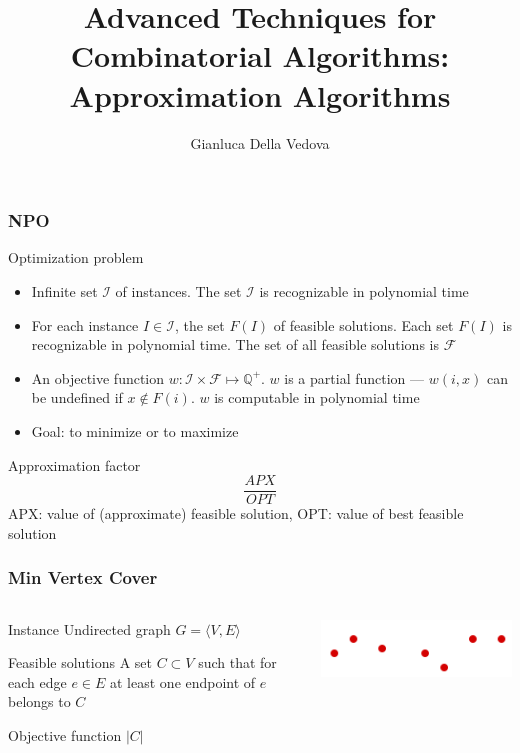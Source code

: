 \documentclass[12pt,aspectratio=169]{beamer}
\author{Gianluca Della Vedova}
\title[Advanced Algorithms]{Advanced Techniques for Combinatorial Algorithms:
Approximation Algorithms}
\institute[]{Univ. Milano--Bicocca\\
  \texttt{https://gianluca.dellavedova.org}}
\begin{document}
\begin{frame}
  \titlepage
\end{frame}



\begin{frame}\frametitle{NPO}
  \begin{block}{Optimization problem}
      \begin{itemize}
  \item
    Infinite set $\mathcal{I}$ of instances.
%
    The set $\mathcal{I}$ is recognizable in polynomial time
  \item
    For each instance $I\in\mathcal{I}$, the set $F(I)$ of feasible solutions.
%
    Each set $F(I)$ is recognizable in polynomial time.
%
    The set of all feasible solutions is $\mathcal{F}$
  \item
    An objective function $w: \mathcal{I} \times \mathcal{F}\mapsto \mathbb{Q}^{+}$.
%
    $w$ is a partial function --- $w(i,x)$ can be undefined if $x\notin F(i)$.
%
    $w$ is computable in polynomial time
  \item
    Goal: to minimize or to maximize
  \end{itemize}
\end{block}
\begin{block}{Approximation factor}
  $$\frac{APX}{OPT}$$
  APX: value of (approximate) feasible solution, OPT: value of best feasible solution
  \end{block}
\end{frame}

\begin{frame}\frametitle{Min Vertex Cover }
\begin{columns} 
  \begin{column}{0.48\textwidth}
  \begin{block}{Instance}
    Undirected graph $G=\langle V,E \rangle$
  \end{block}
  \begin{block}{Feasible solutions}
    A set $C\subset V$ such that for each edge $e\in E$ at least one endpoint of $e$
    belongs to $C$
  \end{block}
  \begin{block}{Objective function}
    $|C|$
  \end{block}
\end{column}
    
    \begin{column}{0.48\textwidth}
      \centering

  \includegraphics[height=0.2\textheight]{img/Vertex-cover}
\end{column}
\end{columns}
\end{frame}
\end{document}
